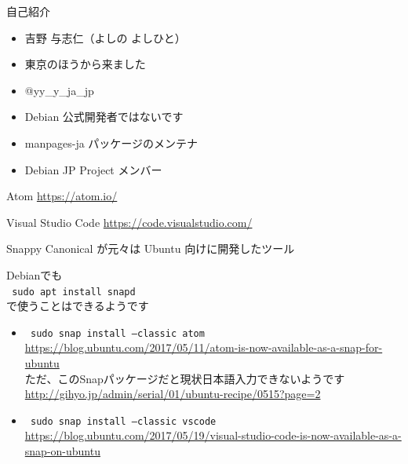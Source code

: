 \frame{\titlepage{}}


\begin{frame}{自己紹介}

\begin{itemize}
 \item 吉野 与志仁（よしの よしひと）
 \item 東京のほうから来ました
 \item @yy\_y\_ja\_jp
 \item Debian 公式開発者ではないです
 \item manpages-ja パッケージのメンテナ
 \item Debian JP Project メンバー
\end{itemize} 
\end{frame}


\begin{frame}{Atom}
\url{https://atom.io/}
\end{frame}

\begin{frame}{Visual Studio Code}
\url{https://code.visualstudio.com/}
\end{frame}

\begin{frame}{Snappy}
Canonical が元々は Ubuntu 向けに開発したツール

Debianでも
\\
{\texttt{
sudo apt install snapd
}}
\\
で使うことはできるようです
\pause

\begin{itemize}[<+->]
 \item {\texttt{
sudo snap install --classic atom
}}
\\
{\scriptsize{\url{https://blog.ubuntu.com/2017/05/11/atom-is-now-available-as-a-snap-for-ubuntu}}}
\\
ただ、このSnapパッケージだと現状日本語入力できないようです
{\scriptsize{\url{http://gihyo.jp/admin/serial/01/ubuntu-recipe/0515?page=2}}}
 \item {\texttt{
sudo snap install --classic vscode
}}
\\
{\scriptsize{\url{https://blog.ubuntu.com/2017/05/19/visual-studio-code-is-now-available-as-a-snap-on-ubuntu}}}

\end{itemize}
\end{frame}

